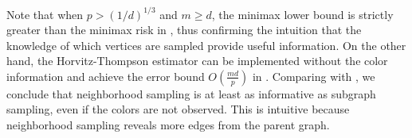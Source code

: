 \begin{remark}
Note that when $ p > (1/d)^{1/3} $ and $ m \geq d $, the minimax lower bound  is strictly greater than the minimax risk in , thus confirming the intuition that the knowledge of which vertices are sampled provide useful information.
On the other hand, the Horvitz-Thompson estimator  can be implemented without the color information and achieve the error bound 
$O(\frac{md}{p})$ in . Comparing with , we conclude that neighborhood sampling is at least as informative as subgraph sampling, even if the colors are not observed. This is intuitive because neighborhood sampling reveals more edges from the parent graph.
\end{remark}

